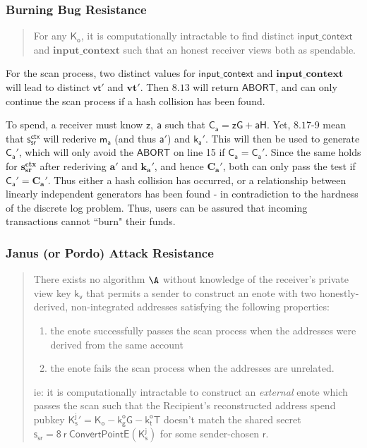 \documentclass{article}
\theoremstyle{definition}
\newcommand{\6}{\mathbf}
\newcommand{\7}{\mathcal}
\renewcommand{\line}[1]{{\text{Section }$8.1$\text{, line }#1}}
\renewcommand{\sf}[1]{{\mathsf{#1}}}
\newcommand{\sfb}[1]{{\mathsf{\mathbf{#1}}}}
\begin{document}
\subsubsection{Burning Bug Resistance} 

\begin{quote}
        For any $\sf{K_o}$, it is computationally intractable to find distinct $\sf{input\_context}$ and $\sfb{input\_context}$ such that an honest receiver views both as spendable. 
\end{quote}

For the scan process, two distinct values for $\sf{input\_context}$ and $\sfb{input\_context}$ will lead to distinct $\sf{vt}'$ and $\sfb{vt}'$. Then \line{3} will return $\sf{ABORT}$, and can only continue the scan process if a hash collision has been found. 
\medskip


To spend, a receiver must know $\sf{z, \ a}$ such that $\sf{C_a = zG + aH}$. Yet, \line{7-9} mean that $\sf{s_{sr}^{ctx}}$ will rederive $\sf{m_a}$ (and thus $\sf{a}'$) and $\sf{k_a}'$. This will then be used to generate $\sf{C_a}'$, which will only avoid the $\sf{ABORT}$ on line 15 if $\sf{C_a} = \sf{C_a}'$. Since the same holds for $\sfb{s_{sr}^{ctx}}$ after rederiving $\sfb{a}'$ and $\sfb{k_a}'$, and hence $\sfb{C_a}'$, both can only pass the test if $\sf{C_a}' = \sfb{C_a}'$. Thus either a hash collision has occurred, or a relationship between linearly independent generators has been found - in contradiction to the hardness of the discrete log problem. Thus, users can be assured that incoming transactions cannot ``burn" their funds.







\subsubsection{Janus (or Pordo) Attack Resistance} 

\begin{quote}
        There exists no algorithm $\A$ without knowledge of the receiver's private view key $\sf{k_v}$ that permits a sender to construct an enote with two honestly-derived, non-integrated addresses satisfying the following properties: 
        \begin{enumerate}
            \item the enote successfully passes the scan process when the addresses were derived from the same account 

            \item the enote fails the scan process when the addresses are unrelated.
        \end{enumerate}
        ie: it is computationally intractable to construct an \textit{external} enote which passes the scan such that the Recipient's reconstructed address spend pubkey $\sf{K_{s}^{j}}' = \sf{K_o - k_g^{o} G - k_t^{o} T}$ doesn't match the shared secret $\sf{s_{sr} = 8 \ r \ ConvertPointE(K_s^{j})}$ for some sender-chosen $\sf{r}$.
        
\end{quote}
\end{document}
